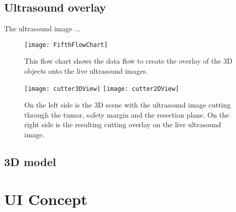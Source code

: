 \subsection{Ultrasound overlay}
The ultrasound image ...
\begin{figure}[H]
  \centering
 \texttt{[image: FifthFlowChart]}
  \caption{This flow chart shows the data flow to create the overlay of the 3D
    objects onto the live ultrasound images.}
  \label{fig:FifthFlowChart}
\end{figure}
\begin{figure}[H]
  \centering
  \texttt{[image: cutter3DView]} 
  \endminipage
  \hfill
  \texttt{[image: cutter2DView]}
  \endminipage
  \hfill 
 \caption{On the left side is the 3D scene with the ultrasound image cutting
   through the tumor, safety margin and the resection plane. On the right side
   is the resulting cutting overlay on the live ultrasound image.}
  \label{fig:cutterExample}
\end{figure}
\subsection{3D model}
\section{UI Concept}
